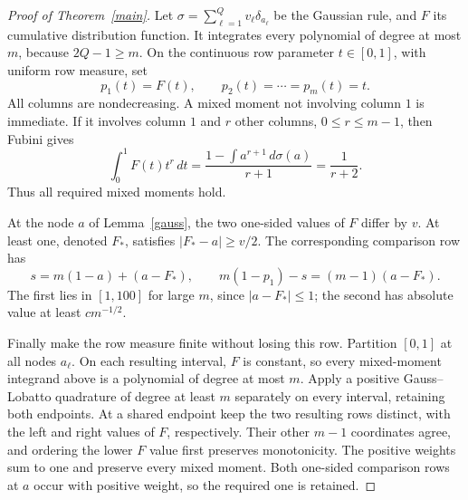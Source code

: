 \documentclass[11pt]{article}
\begin{document}
\begin{proof}[Proof of Theorem~\ref{main}]
Let $\sigma=\sum_{\ell=1}^Qv_\ell\delta_{a_\ell}$ be the Gaussian rule, and $F$ its
cumulative distribution function. It integrates every polynomial of
degree at most $m$, because $2Q-1\ge m$.
On the continuous row parameter $t\in[0,1]$, with uniform row measure,
set
\[
 p_1(t)=F(t),\qquad p_2(t)=\cdots=p_m(t)=t.
\]
All columns are nondecreasing. A mixed moment not involving column
$1$ is immediate. If it involves column $1$ and $r$ other columns,
$0\le r\le m-1$, then Fubini gives
\[
 \int_0^1F(t)t^r\,dt
 =\frac{1-\int a^{r+1}\,d\sigma(a)}{r+1}
 =\frac1{r+2}.
\]
Thus all required mixed moments hold.

At the node $a$ of Lemma~\ref{gauss}, the two one-sided values of
$F$ differ by $v$. At least one, denoted $F_*$, satisfies
$|F_*-a|\ge v/2$. The corresponding comparison row has
\[
 s=m(1-a)+(a-F_*),\qquad
 m(1-p_1)-s=(m-1)(a-F_*).
\]
The first lies in $[1,100]$ for large $m$, since $|a-F_*|\le1$;
the second has absolute value at least $c m^{-1/2}$.

Finally make the row measure finite without losing this row.
Partition $[0,1]$ at all nodes $a_\ell$. On each resulting interval,
$F$ is constant, so every mixed-moment integrand above is a polynomial
of degree at most $m$. Apply a positive Gauss--Lobatto quadrature
of degree at least $m$ separately on every interval, retaining both
endpoints. At a shared endpoint keep the two resulting rows distinct,
with the left and right values of $F$, respectively. Their other
$m-1$ coordinates agree, and ordering the lower $F$ value first
preserves monotonicity. The positive weights sum to one and preserve
every mixed moment. Both one-sided comparison rows at $a$ occur with
positive weight, so the required one is retained.
\end{proof}
\end{document}
